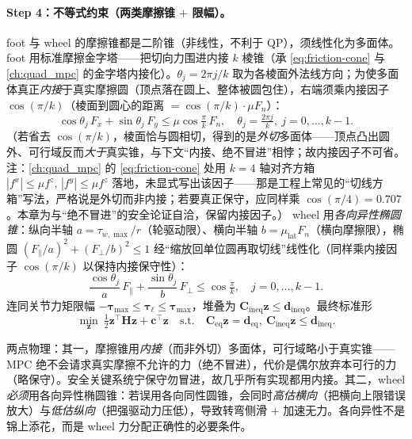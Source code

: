 \paragraph{Step 4：不等式约束（两类摩擦锥 $+$ 限幅）。}
foot 与 wheel 的摩擦锥都是二阶锥（非线性，不利于 QP），须线性化为多面体。foot 用标准摩擦金字塔——把切向力围进内接 $k$ 棱锥（承 \cref{eq:friction-cone} 与 \cref{ch:quad_mpc} 的金字塔内接化）。$\theta_j=2\pi j/k$ 取为各棱面外法线方向；为使多面体真正\emph{内接}于真实摩擦圆（顶点落在圆上、整体被圆包住），右端须乘内接因子 $\cos(\pi/k)$（棱面到圆心的距离 $=\cos(\pi/k)\cdot\mu F_n$）：
\begin{equation}
  \cos\theta_j\,F_x+\sin\theta_j\,F_y\le\mu\cos\!\tfrac{\pi}{k}\,F_n,\quad \theta_j=\tfrac{2\pi j}{k},\ j=0,\dots,k-1.
  \label{eq:wl-conefoot}
\end{equation}
（若省去 $\cos(\pi/k)$，棱面恰与圆相切，得到的是\emph{外切}多面体——顶点凸出圆外、可行域反而\emph{大于}真实锥，与下文“内接、绝不冒进”相悖；故内接因子不可省。注：\cref{ch:quad_mpc} 的 \cref{eq:friction-cone} 处用 $k\!=\!4$ 轴对齐方箱 $|f^{x}|\le\mu f^{z},\,|f^{y}|\le\mu f^{z}$ 落地，未显式写出该因子——那是工程上常见的“切线方箱”写法，严格说是外切而非内接；若要真正保守，应同样乘 $\cos(\pi/4)\!=\!0.707$。本章为与“绝不冒进”的安全论证自洽，保留内接因子。）
wheel 用\emph{各向异性椭圆锥}：纵向半轴 $a=\tau_{w,\max}/r$（轮驱动限）、横向半轴 $b=\mu_{\mathrm{lat}}F_n$（横向摩擦限），椭圆 $(F_\parallel/a)^2+(F_\perp/b)^2\le1$ 经“缩放回单位圆再取切线”线性化（同样乘内接因子 $\cos(\pi/k)$ 以保持内接保守性）：
\begin{equation}
  \frac{\cos\theta_j}{a}\,F_{\parallel}+\frac{\sin\theta_j}{b}\,F_{\perp}\le \cos\!\tfrac{\pi}{k},\quad j=0,\dots,k-1.
  \label{eq:wl-conewheel}
\end{equation}
连同关节力矩限幅 $-\boldsymbol\tau_{\max}\le\boldsymbol\tau_\ell\le\boldsymbol\tau_{\max}$，堆叠为 $\mathbf{C}_{\mathrm{ineq}}\mathbf{z}\le\mathbf{d}_{\mathrm{ineq}}$。最终标准形
\begin{equation}
  \min_{\mathbf{z}}\ \tfrac12\mathbf{z}^\top\mathbf{H}\mathbf{z}+\mathbf{c}^\top\mathbf{z}\quad\text{s.t.}\quad \mathbf{C}_{\mathrm{eq}}\mathbf{z}=\mathbf{d}_{\mathrm{eq}},\ \mathbf{C}_{\mathrm{ineq}}\mathbf{z}\le\mathbf{d}_{\mathrm{ineq}}.
  \label{eq:wl-qp}
\end{equation}

\begin{insight}
两点物理：其一，摩擦锥用\emph{内接}（而非外切）多面体，可行域略小于真实锥——MPC 绝不会请求真实摩擦不允许的力（绝不冒进），代价是偶尔放弃本可行的力（略保守）。安全关键系统宁保守勿冒进，故几乎所有实现都用内接。其二，wheel\emph{必须}用各向异性椭圆锥：若误用各向同性圆锥，会同时\emph{高估横向}（把横向上限错误放大）与\emph{低估纵向}（把强驱动力压低），导致转弯侧滑 $+$ 加速无力。各向异性不是锦上添花，而是 wheel 力分配正确性的必要条件。
\end{insight}

